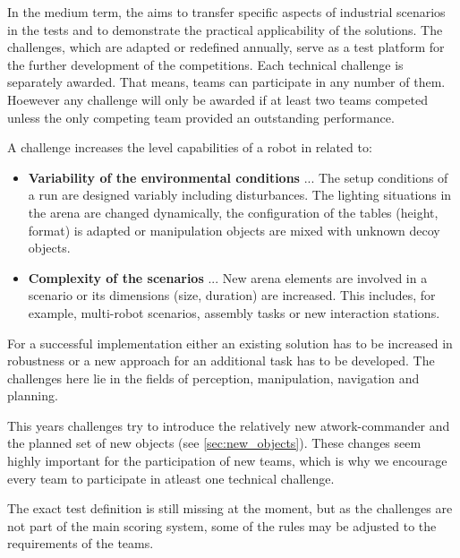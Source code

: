 
In the medium term, the \RCAW aims to transfer specific aspects of industrial scenarios in the tests and to demonstrate the practical applicability of the solutions. The challenges, which are adapted or redefined annually, serve as a test platform for the further development of the competitions. Each technical challenge is separately awarded. That means, teams can participate in any number of them. Hoewever any challenge will only be awarded if at least two teams competed unless the only competing team provided an outstanding performance.

A challenge increases the level capabilities of a robot in \RCAW related to:

\begin{itemize}
  \item \textbf{Variability of the environmental conditions} ... The setup conditions of a run are designed variably including disturbances. The lighting situations in the arena are changed dynamically, the configuration of the tables (height, format) is adapted or manipulation objects are mixed with unknown decoy objects.
  \item \textbf{Complexity of the scenarios} ... New arena elements are involved in a scenario
  or its dimensions (size, duration) are increased. This includes, for example, multi-robot scenarios, assembly tasks or new interaction stations.
\end{itemize}

For a successful implementation either an existing solution has to be increased in robustness or a new approach for an additional task has to be developed. The challenges here lie in the fields of perception, manipulation, navigation and planning.

This years challenges try to introduce the relatively new atwork-commander and the planned set of new objects (see \ref{sec:new_objects}).
These changes seem highly important for the participation of new teams, which is why we encourage every team to participate in atleast one technical challenge.

The exact test definition is still missing at the moment, but as the challenges are not part of the main scoring system, some of the rules may be adjusted to the requirements of the teams.

